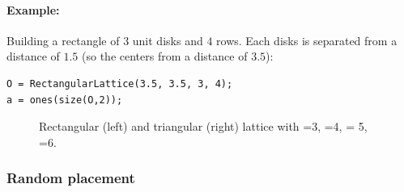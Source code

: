 \paragraph{Example:} Building a rectangle of $3$ unit disks and $4$ rows. Each disks is separated from a distance of $1.5$ (so the centers from a distance of $3.5$):
\begin{lstlisting}
O = RectangularLattice(3.5, 3.5, 3, 4);
a = ones(size(O,2));
\end{lstlisting}

\begin{figure}
\centering
{}\quad{}
\caption{Rectangular (left) and triangular (right) lattice with =3, =4,  = 5, =6.}
\label{fig:lattices}
\end{figure}


\subsubsection{Random placement}

